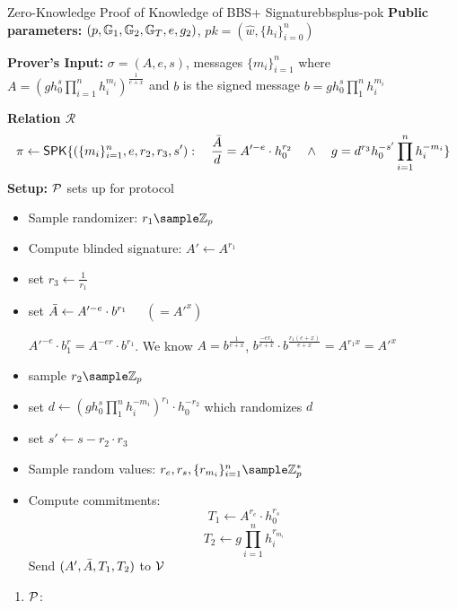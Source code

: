 {\begin{protocol}{Zero-Knowledge Proof of Knowledge of BBS+ Signature}{bbsplus-pok}
    \vspace{1em}
    \textbf{Public parameters:} $(p, \mathbb{G}_1, \mathbb{G}_2, \mathbb{G}_T, e, g_2)$, $pk = (\hat{w}, \{h_i\}_{i=0}^n)$
    
    \textbf{Prover's Input:} $\sigma = (A,e,s)$, messages $\{m_i\}_{i=1}^n$ where $A = (gh_0^s\prod_{i=1}^n h_i^{m_i})^{\frac{1}{e+x}}$ and $b$ is the signed message $b = gh_0^s \prod_1^nh_i^{m_i}$

    \textbf{Relation $\mathcal{R}$}
        \[
        \pi \gets \mathsf{SPK}\{(\{m_i\}_{i=1}^n, e, r_2, r_3, s'): \quad \frac{\Bar{A}}{d} = A'^{-e} \cdot h_0^{r_2} \quad \wedge \quad g = d^{r_3}h_0^{-s'}\prod_{i=1}^n h_i^{-m_i}\}
        \]
    \vspace{1em}
    \textbf{Setup: } $\mathcal{P}$ sets up for protocol
    
    \begin{itemize}
                \item Sample randomizer: $r_1 \sample \Z_p$
                \item Compute blinded signature: $A' \gets A^{r_1}$
                \item set $r_3 \gets \frac{1}{r_1}$
                \item set $\Bar{A} \gets A'^{-e} \cdot b^{r_1}$ $\quad (=A'^{x})$ 
                
                $A'^{-e}\cdot b^r_1 = A^{-er} \cdot b^{r_1}$. We know $A = b^{\frac{1}{e+x}}$, $b^{\frac{-er_1}{e+x}} \cdot b^{\frac{r_1(e+x)}{e+x}} = A^{r_1x} = A'^x$
                
                \item sample $r_2 \sample \Z_p$
                \item set $d \gets (gh_0^s \prod_1^nh_i^{-m_i})^{r_1} \cdot h_0^{-r_2}$ which randomizes $d$
                \item set $s' \gets s - r_2 \cdot r_3$
                \item Sample random values: $r_e, r_s, \{r_{m_i}\}_{i=1}^n \sample \Z_p^*$
                \item Compute commitments:
                \[
                    T_1 \gets A^{r_e} \cdot h_0^{r_s}
                \]
                \[
                    T_2 \gets g\prod_{i=1}^n h_i^{r_{m_i}}
                \]
                Send $(A', \Bar{A}, T_1, T_2)$ to $\mathcal{V}$
            \end{itemize}
    \begin{enumerate}
        \item $\mathcal{P}$:
        

\end{enumerate}
\end{protocol}}
